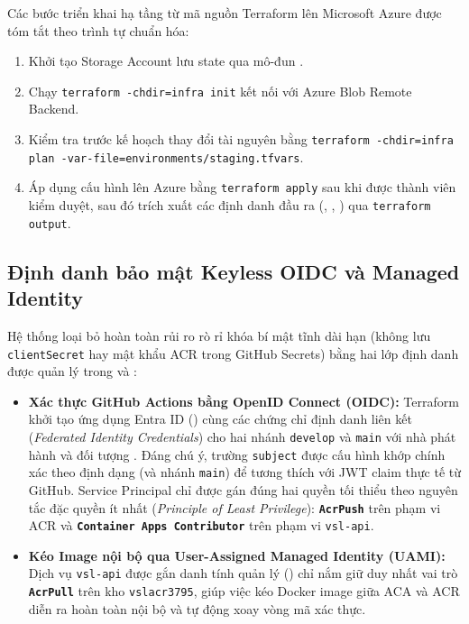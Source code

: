 Các bước triển khai hạ tầng từ mã nguồn Terraform lên Microsoft Azure được tóm tắt theo trình tự chuẩn hóa:
\begin{enumerate}
    \item Khởi tạo Storage Account lưu state qua mô-đun .
    \item Chạy \texttt{terraform -chdir=infra init} kết nối với Azure Blob Remote Backend.
    \item Kiểm tra trước kế hoạch thay đổi tài nguyên bằng \texttt{terraform -chdir=infra plan -var-file=environments/staging.tfvars}.
    \item Áp dụng cấu hình lên Azure bằng \texttt{terraform apply} sau khi được thành viên kiểm duyệt, sau đó trích xuất các định danh đầu ra (, , ) qua \texttt{terraform output}.
\end{enumerate}

\subsection{Định danh bảo mật Keyless OIDC và Managed Identity}
\label{subsec:bao_mat_oidc}

Hệ thống loại bỏ hoàn toàn rủi ro rò rỉ khóa bí mật tĩnh dài hạn (không lưu \texttt{clientSecret} hay mật khẩu ACR trong GitHub Secrets) bằng hai lớp định danh được quản lý trong  và :
\begin{itemize}
    \item \textbf{Xác thực GitHub Actions bằng OpenID Connect (OIDC):} Terraform khởi tạo ứng dụng Entra ID () cùng các chứng chỉ định danh liên kết (\textit{Federated Identity Credentials}) cho hai nhánh \texttt{develop} và \texttt{main} với nhà phát hành  và đối tượng . Đáng chú ý, trường \texttt{subject} được cấu hình khớp chính xác theo định dạng  (và nhánh \texttt{main}) để tương thích với JWT claim thực tế từ GitHub. Service Principal chỉ được gán đúng hai quyền tối thiểu theo nguyên tắc đặc quyền ít nhất (\textit{Principle of Least Privilege}): \textbf{\texttt{AcrPush}} trên phạm vi ACR và \textbf{\texttt{Container Apps Contributor}} trên phạm vi \texttt{vsl-api}.
    \item \textbf{Kéo Image nội bộ qua User-Assigned Managed Identity (UAMI):} Dịch vụ \texttt{vsl-api} được gắn danh tính quản lý  () chỉ nắm giữ duy nhất vai trò \textbf{\texttt{AcrPull}} trên kho \texttt{vslacr3795}, giúp việc kéo Docker image giữa ACA và ACR diễn ra hoàn toàn nội bộ và tự động xoay vòng mã xác thực.
\end{itemize}

